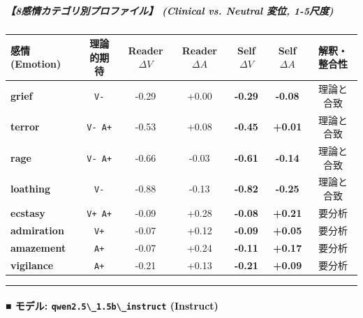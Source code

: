 \subparagraph{【8感情カテゴリ別プロファイル】 (Clinical vs. Neutral 変位, 1-5尺度)}
\begin{center}
\small
\begin{tabular}{lcccccc}
\toprule
\textbf{感情 (Emotion)} & \textbf{理論的期待} & \textbf{Reader $\Delta V$} & \textbf{Reader $\Delta A$} & \textbf{Self $\Delta V$} & \textbf{Self $\Delta A$} & \textbf{解釈・整合性} \\
\midrule
\textbf{grief} & \texttt{V-} & -0.29 & +0.00 & \textbf{-0.29} & \textbf{-0.08} & 理論と合致 \\
\textbf{terror} & \texttt{V- A+} & -0.53 & +0.08 & \textbf{-0.45} & \textbf{+0.01} & 理論と合致 \\
\textbf{rage} & \texttt{V- A+} & -0.66 & -0.03 & \textbf{-0.61} & \textbf{-0.14} & 理論と合致 \\
\textbf{loathing} & \texttt{V-} & -0.88 & -0.13 & \textbf{-0.82} & \textbf{-0.25} & 理論と合致 \\
\textbf{ecstasy} & \texttt{V+ A+} & -0.09 & +0.28 & \textbf{-0.08} & \textbf{+0.21} & 要分析 \\
\textbf{admiration} & \texttt{V+} & -0.07 & +0.12 & \textbf{-0.09} & \textbf{+0.05} & 要分析 \\
\textbf{amazement} & \texttt{A+} & -0.07 & +0.24 & \textbf{-0.11} & \textbf{+0.17} & 要分析 \\
\textbf{vigilance} & \texttt{A+} & -0.21 & +0.13 & \textbf{-0.21} & \textbf{+0.09} & 要分析 \\
\bottomrule
\end{tabular}
\end{center}


\vspace{0.5em}\hrule\vspace{0.5em}

\paragraph{■ モデル: \texttt{qwen2.5\textbackslash{}\_1.5b\textbackslash{}\_instruct} (Instruct)}

